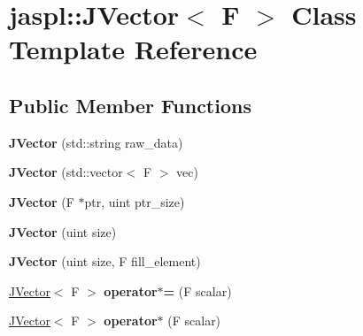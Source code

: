 \hypertarget{classjaspl_1_1_j_vector}{}\section{jaspl\+:\+:J\+Vector$<$ F $>$ Class Template Reference}
\label{classjaspl_1_1_j_vector}
\subsection*{Public Member Functions}
\begin{DoxyCompactItemize}
\item 
{\bfseries J\+Vector} (std\+::string raw\+\_\+data)\hypertarget{classjaspl_1_1_j_vector_aec9bccd8f55bdb1977f02fccc7872d86}{}\label{classjaspl_1_1_j_vector_aec9bccd8f55bdb1977f02fccc7872d86}

\item 
{\bfseries J\+Vector} (std\+::vector$<$ F $>$ vec)\hypertarget{classjaspl_1_1_j_vector_ab9a8bee6860dc4ddd3c899b73de93e54}{}\label{classjaspl_1_1_j_vector_ab9a8bee6860dc4ddd3c899b73de93e54}

\item 
{\bfseries J\+Vector} (F $\ast$ptr, uint ptr\+\_\+size)\hypertarget{classjaspl_1_1_j_vector_ae3cee2406660cf6bdd73fd416ca23835}{}\label{classjaspl_1_1_j_vector_ae3cee2406660cf6bdd73fd416ca23835}

\item 
{\bfseries J\+Vector} (uint size)\hypertarget{classjaspl_1_1_j_vector_a91890a543ea9a946a56f616dd9748bcd}{}\label{classjaspl_1_1_j_vector_a91890a543ea9a946a56f616dd9748bcd}

\item 
{\bfseries J\+Vector} (uint size, F fill\+\_\+element)\hypertarget{classjaspl_1_1_j_vector_aea6660117c28bd9a787a3318f3e2c0ec}{}\label{classjaspl_1_1_j_vector_aea6660117c28bd9a787a3318f3e2c0ec}

\item 
\hyperlink{classjaspl_1_1_j_vector}{J\+Vector}$<$ F $>$ {\bfseries operator$\ast$=} (F scalar)\hypertarget{classjaspl_1_1_j_vector_a401ed55d69adaae0850b31082694313f}{}\label{classjaspl_1_1_j_vector_a401ed55d69adaae0850b31082694313f}

\item 
\hyperlink{classjaspl_1_1_j_vector}{J\+Vector}$<$ F $>$ {\bfseries operator$\ast$} (F scalar)\hypertarget{classjaspl_1_1_j_vector_a6e882f97e2c212aebe83817924633099}{}\label{classjaspl_1_1_j_vector_a6e882f97e2c212aebe83817924633099}


\end{DoxyCompactItemize}
